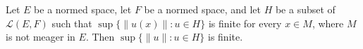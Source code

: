 Let $E$ be a normed space, let $F$ be a normed space, and let $H$ be a subset of $\mathcal{L}(E, F)$ such that $\sup\{\|u(x)\|: u \in H\}$ is finite for every $x \in M$, where $M$ is not meager in $E$. Then $\sup\{\|u\|: u \in H\}$ is finite.

